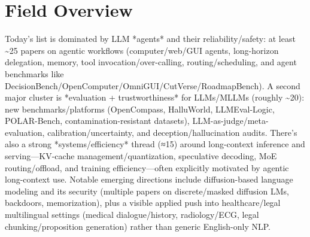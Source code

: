 \documentclass[12pt,letterpaper]{article}
\begin{document}
\medskip



\section*{Field Overview}
{\footnotesize Today's list is dominated by LLM *agents* and their reliability/safety: at least \textasciitilde{}25 papers on agentic workflows (computer/web/GUI agents, long-horizon delegation, memory, tool invocation/over-calling, routing/scheduling, and agent benchmarks like DecisionBench/OpenComputer/OmniGUI/CutVerse/RoadmapBench). A second major cluster is *evaluation + trustworthiness* for LLMs/MLLMs (roughly \textasciitilde{}20): new benchmarks/platforms (OpenCompass, HalluWorld, LLMEval-Logic, POLAR-Bench, contamination-resistant datasets), LLM-as-judge/meta-evaluation, calibration/uncertainty, and deception/hallucination audits. There's also a strong *systems/efficiency* thread (≈15) around long-context inference and serving---KV-cache management/quantization, speculative decoding, MoE routing/offload, and training efficiency---often explicitly motivated by agentic long-context use. Notable emerging directions include diffusion-based language modeling and its security (multiple papers on discrete/masked diffusion LMs, backdoors, memorization), plus a visible applied push into healthcare/legal multilingual settings (medical dialogue/history, radiology/ECG, legal chunking/proposition generation) rather than generic English-only NLP.}
\end{document}
